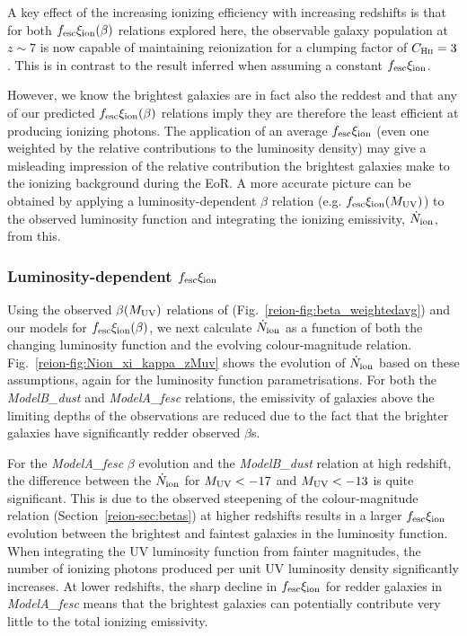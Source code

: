 A key effect of the increasing ionizing efficiency with increasing redshifts is that for both $f_{\rm{esc}}\xi_{\rm{ion}}(\beta)$ relations explored here, the observable galaxy population at $z\sim7$ is now capable of maintaining reionization for a clumping factor of $C_{\textsc{Hii}} = 3$. This is in contrast to the result inferred when assuming a constant $f_{\rm{esc}}\xi_{\rm{ion}}$.  

However, we know the brightest galaxies are in fact also the reddest and that any of our predicted $f_{\rm{esc}}\xi_{\rm{ion}}(\beta)$ relations imply they are therefore the least efficient at producing ionizing photons. The application of an average $f_{\rm{esc}}\xi_{\rm{ion}}$ (even one weighted by the relative contributions to the luminosity density) may give a misleading impression of the relative contribution the brightest galaxies make to the ionizing background during the EoR. A more accurate picture can be obtained by applying a luminosity-dependent $\beta$ relation (e.g. $f_{\rm{esc}}\xi_{\rm{ion}}(M_{\rm{UV}})$) to the observed luminosity function and integrating the ionizing emissivity, $\dot{N}_{\rm{ion}}$, from this.

\subsubsection{Luminosity-dependent $f_{\rm{esc}}\xi_{\rm{ion}}$}
Using the observed $\beta(M_{\rm{UV}})$ relations of \citet{Bouwens:2013vf} (Fig.~\ref{reion-fig:beta_weightedavg}) and our models for $f_{\rm{esc}}\xi_{\rm{ion}}(\beta)$, we next calculate $\dot{N}_{\rm{ion}}$ as a function of both the changing luminosity function and the evolving colour-magnitude relation. Fig.~\ref{reion-fig:Nion_xi_kappa_zMuv} shows the evolution of $\dot{N}_{\rm{ion}}$ based on these assumptions, again for the \citet{2015ApJ...803...34B} luminosity function parametrisations. For both the \emph{ModelB\_dust} and \emph{ModelA\_fesc} relations, the emissivity of galaxies above the limiting depths of the observations are reduced due to the fact that the brighter galaxies have significantly redder observed $\beta$s. 

For the \emph{ModelA\_fesc} $\beta$ evolution and the \emph{ModelB\_dust} relation at high redshift, the difference between the $\dot{N}_{\rm{ion}}$ for $M_{\rm{UV}} < -17$ and $M_{\rm{UV}} < -13$ is quite significant. This is due to the observed steepening of the colour-magnitude relation (Section~\ref{reion-sec:betas}) at higher redshifts results in a larger $f_{\rm{esc}}\xi_{\rm{ion}}$ evolution between the brightest and faintest galaxies in the luminosity function. When integrating the UV luminosity function from fainter magnitudes, the number of ionizing photons produced per unit UV luminosity density significantly increases. At lower redshifts, the sharp decline in $f_{\rm{esc}}\xi_{\rm{ion}}$ for redder galaxies in \emph{ModelA\_fesc} means that the brightest galaxies can potentially contribute very little to the total ionizing emissivity.

